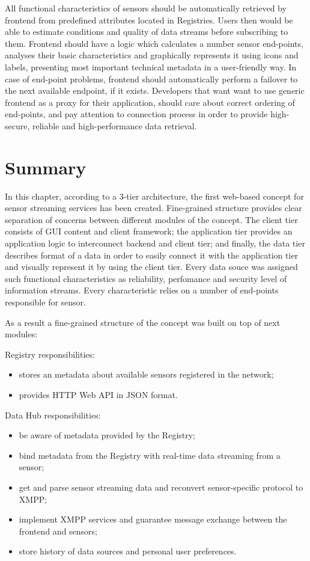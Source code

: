 All functional characteristics of sensors should be automatically retrieved by frontend from predefined attributes located in Registries. Users then would be able to estimate conditions and quality of data streams before subscribing to them. Frontend should have a logic which calculates a number sensor end-points, analyses their basic characteristics and graphically represents it using icons and labels, presenting most important technical metadata in a user-friendly way. In case of end-point problems, frontend should automatically perform a failover to the next available endpoint, if it exists. Developers that want want to use generic frontend as a proxy for their application, should care about correct ordering of end-points, and pay attention to connection process in order to provide high-secure, reliable and high-performance data retrieval.

\section{Summary}
	In this chapter, according to a 3-tier architecture, the first web-based concept for sensor streaming services has been created. Fine-grained structure provides clear separation of concerns between different modules of the concept. The client tier consists of GUI content and client framework; the application tier provides an application logic to interconnect backend and client tier; and finally, the data tier describes format of a data in order to easily connect it with the application tier and visually represent it by using the client tier. Every data souce was assigned such functional characteristics as reliability, perfomance and security level of information streams. Every characteristic relies on a number of end-points responsible for sensor. 

  As a result a fine-grained structure of the concept was built on top of next modules: 
  
  Registry responsibilities:
  \begin{itemize}
  \item stores an metadata about available sensors registered in the network;
  \item provides HTTP Web API in JSON format.
  \end{itemize}
  
  Data Hub responsibilities:
  \begin{itemize}
    \item be aware of metadata provided by the Registry;
    \item bind metadata from the Registry with real-time data streaming from a sensor;
    \item get and parse sensor streaming data and reconvert sensor-specific protocol to XMPP;
    \item implement XMPP services and guarantee message exchange between the frontend and sensors;
    \item store history of data sources and personal user preferences.
  \end{itemize}

